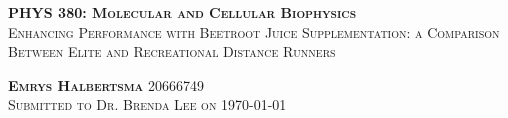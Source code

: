 \begin{titlepage}
\begin{center}
    \vspace*{90mm}
    \Huge{ 
        \textsc{
            \textbf{PHYS 380: Molecular and Cellular Biophysics}
        }
    }
    \vspace{4mm}
    \\\hline
    \vspace{4mm}
    \huge{
        \textsc{Enhancing Performance with Beetroot Juice Supplementation: a Comparison Between Elite and Recreational Distance Runners}
    }
\end{center}

\vspace*{25mm}

\begin{center}
    \textsc{
        \huge{
            \textbf{Emrys Halbertsma}
        }
        \huge{20666749\\}
        \vspace{4mm}
	\Large{
	    Submitted to Dr. Brenda Lee on \today{} }
    }
\end{center}

\pagebreak

\end{titlepage}
